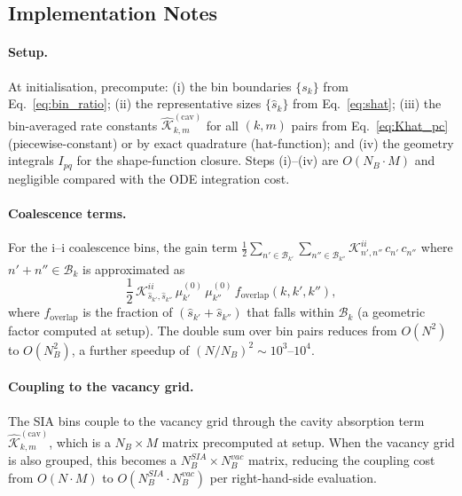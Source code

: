 \documentclass[pdflatex,sn-basic]{sn-jnl} %
\begin{document}
\subsection{Implementation Notes}
\label{sec:grouping_impl}

\paragraph{Setup.}
At initialisation, precompute: (i) the bin boundaries $\{s_k\}$
from Eq.~\eqref{eq:bin_ratio}; (ii) the representative sizes
$\{\hat{s}_k\}$ from Eq.~\eqref{eq:shat}; (iii) the bin-averaged
rate constants $\hat{\mathcal{K}}_{k,m}^{(\mathrm{cav})}$ for all
$(k,m)$ pairs from Eq.~\eqref{eq:Khat_pc} (piecewise-constant) or
by exact quadrature (hat-function); and (iv) the geometry integrals
$I_{pq}$ for the shape-function closure. Steps (i)--(iv) are
$O(N_B \cdot M)$ and negligible compared with the ODE integration
cost.

\paragraph{Coalescence terms.}
For the i--i coalescence bins, the gain term
$\frac{1}{2}\sum_{n'\in\mathcal{B}_{k'}} \sum_{n''\in\mathcal{B}_{k''}}
\mathcal{K}_{n',n''}^{ii}\,c_{n'}\,c_{n''}$ where $n'+n''\in\mathcal{B}_k$
is approximated as
\begin{equation}\label{eq:coal_binned}
    \frac{1}{2}\,\mathcal{K}_{\hat{s}_{k'},\hat{s}_{k''}}^{ii}\,
    \mu_{k'}^{(0)}\,\mu_{k''}^{(0)}\,
    f_{\mathrm{overlap}}(k,k',k''),
\end{equation}
where $f_{\mathrm{overlap}}$ is the fraction of $(\hat{s}_{k'} +
\hat{s}_{k''})$ that falls within $\mathcal{B}_k$ (a geometric
factor computed at setup). The double sum over bin pairs reduces
from $O(N^2)$ to $O(N_B^2)$, a further speedup of
$(N/N_B)^2 \sim 10^3$--$10^4$.

\paragraph{Coupling to the vacancy grid.}
The SIA bins couple to the vacancy grid through the cavity absorption
term $\hat{\mathcal{K}}_{k,m}^{(\mathrm{cav})}$, which is a
$N_B \times M$ matrix precomputed at setup. When the vacancy grid is
also grouped, this becomes a $N_B^{SIA} \times N_B^{vac}$ matrix,
reducing the coupling cost from $O(N \cdot M)$ to
$O(N_B^{SIA} \cdot N_B^{vac})$ per right-hand-side evaluation.
\end{document}
